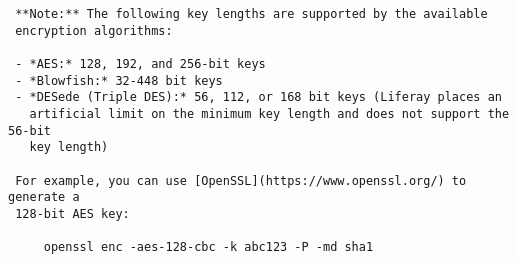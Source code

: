 \noindent\hrulefill

\begin{verbatim}
 **Note:** The following key lengths are supported by the available
 encryption algorithms:
 
 - *AES:* 128, 192, and 256-bit keys
 - *Blowfish:* 32-448 bit keys
 - *DESede (Triple DES):* 56, 112, or 168 bit keys (Liferay places an
   artificial limit on the minimum key length and does not support the 56-bit
   key length)
 
 For example, you can use [OpenSSL](https://www.openssl.org/) to generate a
 128-bit AES key:
 
     openssl enc -aes-128-cbc -k abc123 -P -md sha1
\end{verbatim}

\noindent\hrulefill

